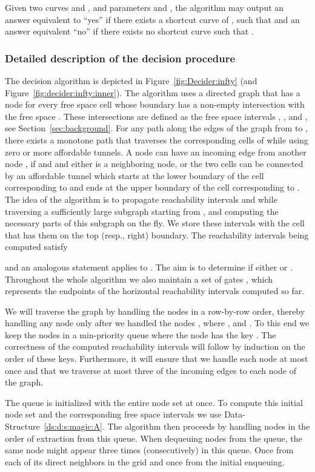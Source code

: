 \documentclass[12pt]{article}
\newcommand{\seclab}[1]{\label{sec:#1}}
\newcommand{\secref}[1]{Section~\ref{sec:#1}}
\newcommand{\figref}[1]{Figure~\ref{fig:#1}}
\newcommand{\dsref}[1]{Data-Structure~\ref{ds:#1}}
\numberwithin{figure}{section}
\numberwithin{equation}{section}
\begin{document}
Given two curves  and , and parameters  and ,
the algorithm may output an answer equivalent to ``yes'' if there
exists a shortcut curve  of , such that
 and an answer equivalent ``no'' if
there exists no shortcut curve such that .



\subsubsection{Detailed description of the decision procedure}
\seclab{b:f:s:decider}

The decision algorithm is depicted in \figref{Decider:infty} (and
\figref{decider:infty:inner}).  The algorithm uses a directed graph
 that has a node  for every free space cell
 whose boundary has a non-empty intersection with the
free space .  These intersections are
defined as the free space intervals ,
,  and , see
\secref{background}.  For any path along the edges of the graph
 from  to , there exists a monotone path that
traverses the corresponding cells of 
while using zero or more affordable tunnels.  A node  can have
an incoming edge from another node , if  and  and either  is a neighboring node, or the two cells
can be connected by an affordable tunnel which starts at the lower
boundary of the cell corresponding to  and ends at the upper
boundary of the cell corresponding to .  The idea of the
algorithm is to propagate reachability intervals  and 
while traversing a sufficiently large subgraph starting from ,
and computing the necessary parts of this subgraph on the fly.  We
store these intervals with the cell  that has them on the top
(resp., right) boundary.  The reachability intervals 
being computed satisfy

and an analogous statement applies to .  The aim is
to determine if either  or .  Throughout the whole algorithm
we also maintain a set of gates , which represents the
endpoints of the horizontal reachability intervals computed so far.

We will traverse the graph by handling the nodes in a row-by-row
order, thereby handling any node  only after we handled the
nodes , where ,  and .
To this end we keep the nodes in a min-priority queue where the node
 has the key .  The correctness of the computed
reachability intervals will follow by induction on the order of these
keys.  Furthermore, it will ensure that we handle each node at most
once and that we traverse at most three of the incoming edges to each
node of the graph.

The queue is initialized with the entire node set at once.  To compute
this initial node set and the corresponding free space intervals we
use \dsref{d:s:magic:A}.  The algorithm then proceeds by handling
nodes in the order of extraction from this queue.  When dequeuing
nodes from the queue, the same node might appear three times
(consecutively) in this queue. Once from each of its direct neighbors
in the grid and once from the initial enqueuing.
\end{document}
